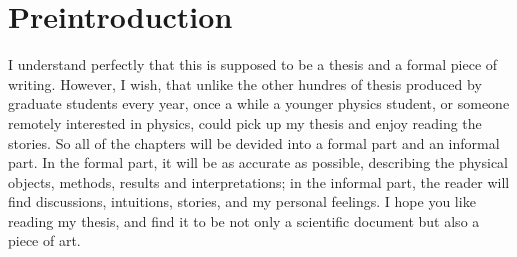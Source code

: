 \section{Preintroduction}
\label{Preintroduction}

I understand perfectly that this is supposed to be a thesis and a formal piece of writing. However, I wish, that unlike the other hundres of thesis produced by graduate students every year, once a while a younger physics student, or someone remotely interested in physics, could pick up my thesis and enjoy reading the stories. So all of the chapters will be devided into a formal part and an informal part. In the formal part, it will be as accurate as possible, describing the physical objects, methods, results and interpretations; in the informal part, the reader will find discussions, intuitions, stories, and my personal feelings. I hope you like reading my thesis, and find it to be not only a scientific document but also a piece of art.
